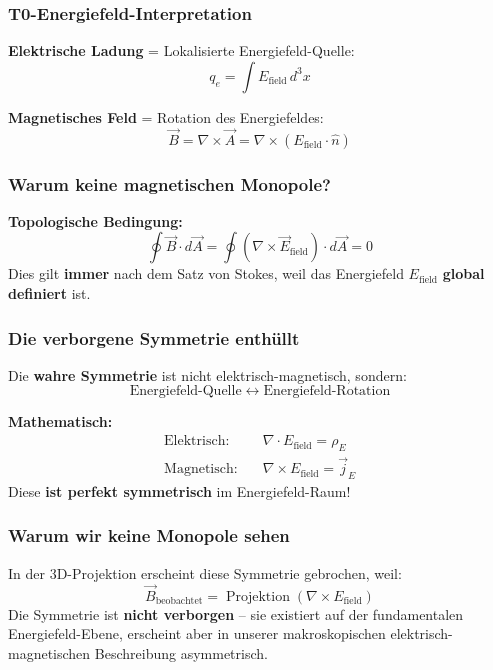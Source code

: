 	\subsubsection*{T0-Energiefeld-Interpretation}
	
	\textbf{Elektrische Ladung} = Lokalisierte Energiefeld-Quelle:
	\[
	q_e = \int E_{\text{field}} \, d^3x
	\]
	
	\textbf{Magnetisches Feld} = Rotation des Energiefeldes:
	\[
	\vec{B} = \nabla \times \vec{A} = \nabla \times (E_{\text{field}} \cdot \hat{n})
	\]
	
	\subsubsection*{Warum keine magnetischen Monopole?}
	
	\textbf{Topologische Bedingung:}
	\[
	\oint \vec{B} \cdot d\vec{A} = \oint (\nabla \times \vec{E}_{\text{field}}) \cdot d\vec{A} = 0
	\]
	Dies gilt \textbf{immer} nach dem Satz von Stokes, weil das Energiefeld $E_{\text{field}}$ \textbf{global definiert} ist.
	
	\subsubsection*{Die verborgene Symmetrie enthüllt}
	
	Die \textbf{wahre Symmetrie} ist nicht elektrisch-magnetisch, sondern:
	\[
	\boxed{\text{Energiefeld-Quelle} \;\leftrightarrow\; \text{Energiefeld-Rotation}}
	\]
	
	\textbf{Mathematisch:}
	\begin{align*}
		\text{Elektrisch:} \quad &\nabla \cdot E_{\text{field}} = \rho_E \\
		\text{Magnetisch:} \quad &\nabla \times E_{\text{field}} = \vec{j}_E
	\end{align*}
	Diese \textbf{ist perfekt symmetrisch} im Energiefeld-Raum!
	
	\subsubsection*{Warum wir keine Monopole sehen}
	
	In der 3D-Projektion erscheint diese Symmetrie gebrochen, weil:
	\[
	\vec{B}_{\text{beobachtet}} = \operatorname{Projektion}(\nabla \times E_{\text{field}})
	\]
	Die Symmetrie ist \textbf{nicht verborgen} – sie existiert auf der fundamentalen Energiefeld-Ebene, erscheint aber in unserer makroskopischen elektrisch-magnetischen Beschreibung asymmetrisch.
	
